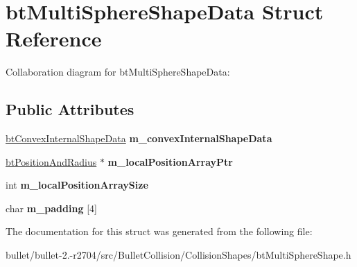 \hypertarget{structbt_multi_sphere_shape_data}{\section{bt\+Multi\+Sphere\+Shape\+Data Struct Reference}
\label{structbt_multi_sphere_shape_data}
}


Collaboration diagram for bt\+Multi\+Sphere\+Shape\+Data\+:
\subsection*{Public Attributes}
\begin{DoxyCompactItemize}
\item 
\hypertarget{structbt_multi_sphere_shape_data_a0ab02433fb0a1450a8989c87413455d0}{\hyperlink{structbt_convex_internal_shape_data}{bt\+Convex\+Internal\+Shape\+Data} {\bfseries m\+\_\+convex\+Internal\+Shape\+Data}}\label{structbt_multi_sphere_shape_data_a0ab02433fb0a1450a8989c87413455d0}

\item 
\hypertarget{structbt_multi_sphere_shape_data_af58e24a22945911c6f7058aa54e3d822}{\hyperlink{structbt_position_and_radius}{bt\+Position\+And\+Radius} $\ast$ {\bfseries m\+\_\+local\+Position\+Array\+Ptr}}\label{structbt_multi_sphere_shape_data_af58e24a22945911c6f7058aa54e3d822}

\item 
\hypertarget{structbt_multi_sphere_shape_data_a244c43eefa09a1eb143422578410c3f3}{int {\bfseries m\+\_\+local\+Position\+Array\+Size}}\label{structbt_multi_sphere_shape_data_a244c43eefa09a1eb143422578410c3f3}

\item 
\hypertarget{structbt_multi_sphere_shape_data_a97c92a875c9a0df06d81031cf1f89daf}{char {\bfseries m\+\_\+padding} \mbox{[}4\mbox{]}}\label{structbt_multi_sphere_shape_data_a97c92a875c9a0df06d81031cf1f89daf}

\end{DoxyCompactItemize}


The documentation for this struct was generated from the following file\+:\begin{DoxyCompactItemize}
\item 
bullet/bullet-\/2.-\/r2704/src/\+Bullet\+Collision/\+Collision\+Shapes/bt\+Multi\+Sphere\+Shape.\+h\end{DoxyCompactItemize}
